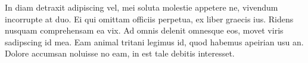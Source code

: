 	In diam detraxit adipiscing vel, mei soluta molestie appetere ne, vivendum incorrupte at duo. Ei qui omittam officiis perpetua, ex liber graecis ius. Ridens nusquam comprehensam ea vix. Ad omnis delenit omnesque eos, movet viris sadipscing id mea. Eam animal tritani legimus id, quod habemus apeirian usu an. Dolore accumsan noluisse no eam, in est tale debitis interesset.

	\begin{figure}[h]
		\center

\end{figure}
